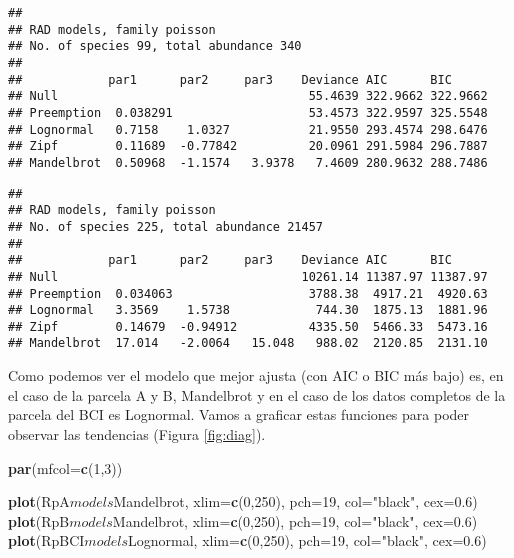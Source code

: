 \documentclass[]{book}
\newenvironment{Shaded}{\begin{snugshade}}{\end{snugshade}}
\newcommand{\KeywordTok}[1]{\textcolor[rgb]{0.13,0.29,0.53}{\textbf{{#1}}}}
\newcommand{\DataTypeTok}[1]{\textcolor[rgb]{0.13,0.29,0.53}{{#1}}}
\newcommand{\DecValTok}[1]{\textcolor[rgb]{0.00,0.00,0.81}{{#1}}}
\newcommand{\FloatTok}[1]{\textcolor[rgb]{0.00,0.00,0.81}{{#1}}}
\newcommand{\StringTok}[1]{\textcolor[rgb]{0.31,0.60,0.02}{{#1}}}
\newcommand{\NormalTok}[1]{{#1}}
\begin{document}
\begin{verbatim}
## 
## RAD models, family poisson 
## No. of species 99, total abundance 340
## 
##            par1      par2     par3    Deviance AIC      BIC     
## Null                                   55.4639 322.9662 322.9662
## Preemption  0.038291                   53.4573 322.9597 325.5548
## Lognormal   0.7158    1.0327           21.9550 293.4574 298.6476
## Zipf        0.11689  -0.77842          20.0961 291.5984 296.7887
## Mandelbrot  0.50968  -1.1574   3.9378   7.4609 280.9632 288.7486
\end{verbatim}

\begin{verbatim}
## 
## RAD models, family poisson 
## No. of species 225, total abundance 21457
## 
##            par1      par2     par3    Deviance AIC      BIC     
## Null                                  10261.14 11387.97 11387.97
## Preemption  0.034063                   3788.38  4917.21  4920.63
## Lognormal   3.3569    1.5738            744.30  1875.13  1881.96
## Zipf        0.14679  -0.94912          4335.50  5466.33  5473.16
## Mandelbrot  17.014   -2.0064   15.048   988.02  2120.85  2131.10
\end{verbatim}

Como podemos ver el modelo que mejor ajusta (con AIC o BIC más bajo) es,
en el caso de la parcela A y B, Mandelbrot y en el caso de los datos
completos de la parcela del BCI es Lognormal. Vamos a graficar estas
funciones para poder observar las tendencias (Figura \ref{fig:diag}).

\begin{Shaded}
\begin{Highlighting}[]
\KeywordTok{par}\NormalTok{(}\DataTypeTok{mfcol=}\KeywordTok{c}\NormalTok{(}\DecValTok{1}\NormalTok{,}\DecValTok{3}\NormalTok{))}

\KeywordTok{plot}\NormalTok{(RpA$models$Mandelbrot, }\DataTypeTok{xlim=}\KeywordTok{c}\NormalTok{(}\DecValTok{0}\NormalTok{,}\DecValTok{250}\NormalTok{), }\DataTypeTok{pch=}\DecValTok{19}\NormalTok{, }\DataTypeTok{col=}\StringTok{"black"}\NormalTok{, }\DataTypeTok{cex=}\FloatTok{0.6}\NormalTok{)}
\KeywordTok{plot}\NormalTok{(RpB$models$Mandelbrot, }\DataTypeTok{xlim=}\KeywordTok{c}\NormalTok{(}\DecValTok{0}\NormalTok{,}\DecValTok{250}\NormalTok{), }\DataTypeTok{pch=}\DecValTok{19}\NormalTok{, }\DataTypeTok{col=}\StringTok{"black"}\NormalTok{, }\DataTypeTok{cex=}\FloatTok{0.6}\NormalTok{)}
\KeywordTok{plot}\NormalTok{(RpBCI$models$Lognormal, }\DataTypeTok{xlim=}\KeywordTok{c}\NormalTok{(}\DecValTok{0}\NormalTok{,}\DecValTok{250}\NormalTok{), }\DataTypeTok{pch=}\DecValTok{19}\NormalTok{, }\DataTypeTok{col=}\StringTok{"black"}\NormalTok{, }\DataTypeTok{cex=}\FloatTok{0.6}\NormalTok{)}
\end{Highlighting}
\end{Shaded}
\end{document}
